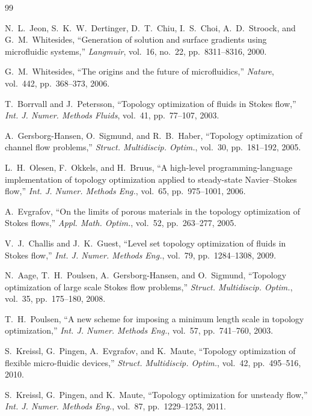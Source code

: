 \begin{thebibliography}{99}

N.~L.~Jeon, S.~K.~W.~Dertinger, D.~T.~Chiu, I.~S.~Choi, A.~D.~Stroock, and G.~M.~Whitesides,
``Generation of solution and surface gradients using microfluidic systems,''
\emph{Langmuir}, vol.~16, no.~22, pp.~8311--8316, 2000.

G.~M.~Whitesides,
``The origins and the future of microfluidics,''
\emph{Nature}, vol.~442, pp.~368--373, 2006.

T.~Borrvall and J.~Petersson,
``Topology optimization of fluids in {S}tokes flow,''
\emph{Int. J. Numer. Methods Fluids}, vol.~41, pp.~77--107, 2003.

A.~Gersborg-Hansen, O.~Sigmund, and R.~B.~Haber,
``Topology optimization of channel flow problems,''
\emph{Struct. Multidiscip. Optim.}, vol.~30, pp.~181--192, 2005.

L.~H.~Olesen, F.~Okkels, and H.~Bruus,
``A high-level programming-language implementation of topology optimization applied to steady-state {N}avier--{S}tokes flow,''
\emph{Int. J. Numer. Methods Eng.}, vol.~65, pp.~975--1001, 2006.

A.~Evgrafov,
``On the limits of porous materials in the topology optimization of {S}tokes flows,''
\emph{Appl. Math. Optim.}, vol.~52, pp.~263--277, 2005.

V.~J.~Challis and J.~K.~Guest,
``Level set topology optimization of fluids in {S}tokes flow,''
\emph{Int. J. Numer. Methods Eng.}, vol.~79, pp.~1284--1308, 2009.

N.~Aage, T.~H.~Poulsen, A.~Gersborg-Hansen, and O.~Sigmund,
``Topology optimization of large scale {S}tokes flow problems,''
\emph{Struct. Multidiscip. Optim.}, vol.~35, pp.~175--180, 2008.

T.~H.~Poulsen,
``A new scheme for imposing a minimum length scale in topology optimization,''
\emph{Int. J. Numer. Methods Eng.}, vol.~57, pp.~741--760, 2003.

S.~Kreissl, G.~Pingen, A.~Evgrafov, and K.~Maute,
``Topology optimization of flexible micro-fluidic devices,''
\emph{Struct. Multidiscip. Optim.}, vol.~42, pp.~495--516, 2010.

S.~Kreissl, G.~Pingen, and K.~Maute,
``Topology optimization for unsteady flow,''
\emph{Int. J. Numer. Methods Eng.}, vol.~87, pp.~1229--1253, 2011.


\end{thebibliography}
